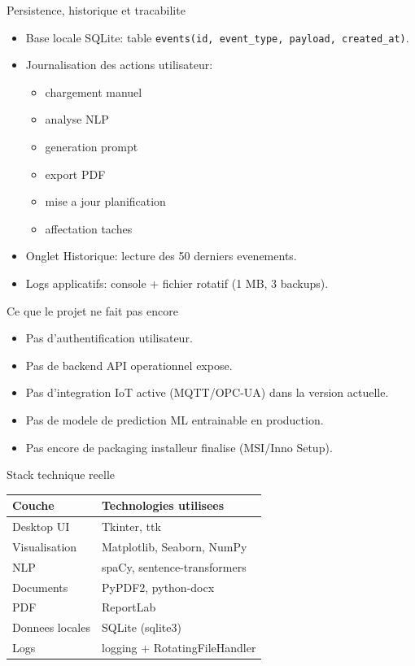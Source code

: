 \documentclass[10pt]{beamer}
\begin{document}
\begin{frame}{Persistence, historique et tracabilite}
\begin{itemize}
\item Base locale SQLite: table \texttt{events(id, event\_type, payload, created\_at)}.
\item Journalisation des actions utilisateur:
\begin{itemize}
\item chargement manuel
\item analyse NLP
\item generation prompt
\item export PDF
\item mise a jour planification
\item affectation taches
\end{itemize}
\item Onglet Historique: lecture des 50 derniers evenements.
\item Logs applicatifs: console + fichier rotatif (1 MB, 3 backups).
\end{itemize}
\end{frame}

\begin{frame}{Ce que le projet ne fait pas encore}
\begin{itemize}
\item Pas d'authentification utilisateur.
\item Pas de backend API operationnel expose.
\item Pas d'integration IoT active (MQTT/OPC-UA) dans la version actuelle.
\item Pas de modele de prediction ML entrainable en production.
\item Pas encore de packaging installeur finalise (MSI/Inno Setup).
\end{itemize}
\end{frame}

\begin{frame}{Stack technique reelle}
\begin{tabular}{ll}
\toprule
Couche & Technologies utilisees \\
\midrule
Desktop UI & Tkinter, ttk \\
Visualisation & Matplotlib, Seaborn, NumPy \\
NLP & spaCy, sentence-transformers \\
Documents & PyPDF2, python-docx \\
PDF & ReportLab \\
Donnees locales & SQLite (sqlite3) \\
Logs & logging + RotatingFileHandler \\
\bottomrule
\end{tabular}
\end{frame}
\end{document}
